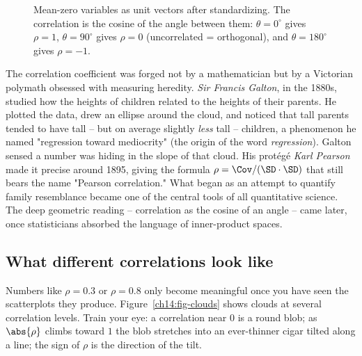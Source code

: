 \begin{figure}[H]
\centering
{}
\caption{Mean-zero variables as unit vectors after standardizing. The correlation is
the cosine of the angle between them: $\theta = 0^\circ$ gives $\rho = 1$,
$\theta = 90^\circ$ gives $\rho = 0$ (uncorrelated = orthogonal), and
$\theta = 180^\circ$ gives $\rho = -1$.}
\label{ch14:fig-cosine}
\end{figure}

\begin{historybox}
The correlation coefficient was forged not by a mathematician but by a Victorian
polymath obsessed with measuring heredity. \emph{Sir Francis Galton}, in the 1880s,
studied how the heights of children related to the heights of their parents. He
plotted the data, drew an ellipse around the cloud, and noticed that tall parents
tended to have tall -- but on average slightly \emph{less} tall -- children, a
phenomenon he named "regression toward mediocrity" (the origin of the word
\emph{regression}). Galton sensed a number was hiding in the slope of that cloud.
His prot\'eg\'e \emph{Karl Pearson} made it precise around 1895, giving the formula
$\rho = \Cov / (\SD\cdot\SD)$ that still bears the name "Pearson correlation." What
began as an attempt to quantify family resemblance became one of the central tools
of all quantitative science. The deep geometric reading -- correlation as the cosine
of an angle -- came later, once statisticians absorbed the language of inner-product
spaces.
\end{historybox}

\subsection{What different correlations look like}

Numbers like $\rho = 0.3$ or $\rho = 0.8$ only become meaningful once you have seen
the scatterplots they produce. Figure~\ref{ch14:fig-clouds} shows clouds at several
correlation levels. Train your eye: a correlation near $0$ is a round blob; as
$\abs{\rho}$ climbs toward $1$ the blob stretches into an ever-thinner cigar tilted
along a line; the sign of $\rho$ is the direction of the tilt.

